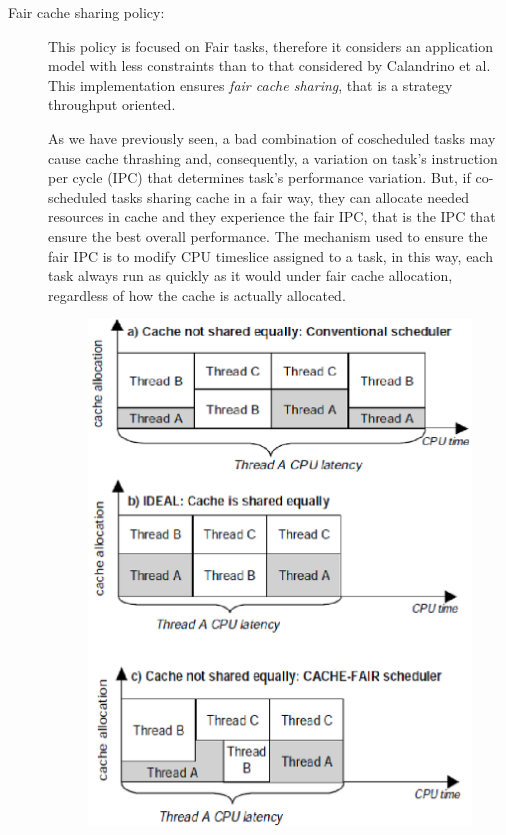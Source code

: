 \begin{description}
\item[Fair cache sharing policy:]

This policy is focused on Fair tasks, therefore it considers an application model with less constraints than to that considered by
Calandrino et al. This implementation ensures \textit{fair cache sharing}, that is a strategy throughput oriented.

As we have previously seen, a bad combination of coscheduled tasks may cause cache thrashing and, consequently, a variation on task's instruction per cycle
(IPC) that determines task's performance variation. But, if co-scheduled tasks sharing cache in a fair way, they can allocate needed resources in cache and
they experience the fair IPC, that is the IPC that ensure the best overall performance. The mechanism used to ensure the fair IPC is to modify CPU timeslice 
assigned to a task, in this way, each task always run as quickly as it would under fair cache allocation, regardless of how the cache is actually allocated.

\begin{figure}[htbp]
\centering
\includegraphics[width=\widefigure]{images/fed_cases.eps}
\caption{}
\label{fig:fed_cases}
\end{figure}



\end{description}
